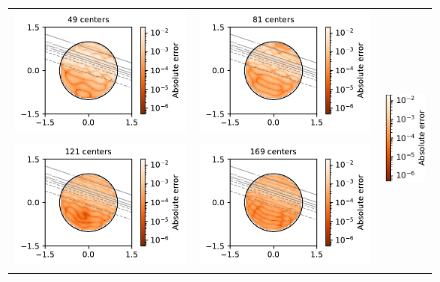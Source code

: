 \documentclass[12pt]{report} %
\begin{document}
\begin{figure}
  \hspace*{-2cm}
  \begin{tabular}{ccl}
    {\includegraphics[width=.4\textwidth, clip=true,trim={0 0 2.1cm 0}]{imagenes/experiments/2d/statistical_2d_full_scheduler_interpolation/arctan_2d/arctan_paper_2d_49.pdf}}                    &
    \includegraphics[width=.4\textwidth, clip=true,trim={0 0 2.1cm 0}]{imagenes/experiments/2d/statistical_2d_full_scheduler_interpolation/arctan_2d/arctan_paper_2d_81.pdf}                      & \multirow{3}{*}{\includegraphics[width=.15\textwidth]{imagenes/experiments/2d/statistical_2d_full_scheduler_interpolation/arctan_2d/colorbar_arctan_averages.pdf}}          \\
    \multicolumn{1}{r}{\includegraphics[width=.4\textwidth, clip=true,trim={0 0 2.1cm 0}]{imagenes/experiments/2d/statistical_2d_full_scheduler_interpolation/arctan_2d/arctan_paper_2d_121.pdf}} & \includegraphics[width=.4\textwidth, clip=true,trim={0 0 2.1cm 0}]{imagenes/experiments/2d/statistical_2d_full_scheduler_interpolation/arctan_2d/arctan_paper_2d_169.pdf} & \\

\end{tabular}
\end{figure}
\end{document}
